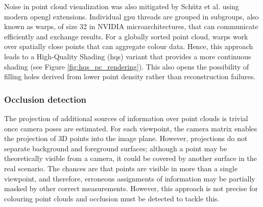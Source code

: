 Noise in point cloud visualization was also mitigated by Schütz et al. \cite{schutz_rendering_2019, schutz_rendering_2021} using modern \acrshort{opengl} extensions. Individual \acrshort{gpu} threads are grouped in subgroups, also known as warps, of size 32 in NVIDIA microarchitectures, that can communicate efficiently and exchange results. For a globally sorted point cloud, warps work over spatially close points that can aggregate colour data. Hence, this approach leads to a High-Quality Shading (\acrshort{hqs}) variant \cite{schutz_rendering_2021} that provides a more continuous shading (see Figure \ref{fig:hqs_pc_rendering}). This also opens the possibility of filling holes derived from lower point density rather than reconstruction failures. 

\subsubsection{Occlusion detection}

The projection of additional sources of information over point clouds is trivial once camera poses are estimated. For each viewpoint, the camera matrix enables the projection of 3D points into the image plane. However, projections do not separate background and foreground surfaces; although a point may be theoretically visible from a camera, it could be covered by another surface in the real scenario. The chances are that points are visible in more than a single viewpoint, and therefore, erroneous assignments of information may be partially masked by other correct measurements. However, this approach is not precise for colouring point clouds and occlusion must be detected to tackle this.    

